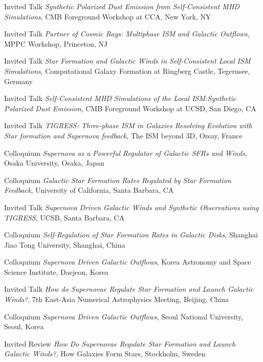 \documentclass[12pt]{article}
\begin{document}
{Invited Talk}
{\emph{Synthetic Polarized Dust Emission from Self-Consistent MHD Simulations},
CMB Foreground Workshop at CCA,
New York, NY}

{Invited Talk}
{\emph{Partner of Cosmic Rays: Multiphase ISM and Galactic Outflows},
MPPC Workshop,
Princeton, NJ}

{Invited Talk}
{\emph{Star Formation and Galactic Winds in Self-Consistent Local ISM Simulations},
Computational Galaxy Formation at Ringberg Castle,
Tegernsee, Germany}

{Invited Talk}
{\emph{Self-Consistent MHD Simulations of the Local ISM:Synthetic Polarized Dust Emission},
CMB Foreground Workshop at UCSD,
San Diego, CA}

{Invited Talk}
{\emph{TIGRESS: Three-phase ISM in Galaxies Resolving Evolution with Star formation and Supernova feedback},
The ISM beyond 3D,
Orsay, France}

{Colloquium}
{\emph{Supernova as a Powerful Regulator of Galactic SFRs and Winds},
Osaka University,
Osaka, Japan}

{Colloquium}
{\emph{Galactic Star Formation Rates Regulated by Star Formation Feedback},
University of California,
Santa Barbara, CA}

{Invited Talk}
{\emph{Supernova Driven Galactic Winds and Synthetic Observations using TIGRESS},
UCSB,
Santa Barbara, CA}

{Colloquium}
{\emph{Self-Regulation of Star Formation Rates in Galactic Disks},
Shanghai Jiao Tong University,
Shanghai, China}

{Colloquium}
{\emph{Supernova Driven Galactic Outflows},
Korea Astronomy and Space Science Institute,
Daejeon, Korea}

{Invited Talk}
{\emph{How do Supernovae Regulate Star Formation and Launch Galactic Winds?},
7th East-Asia Numerical Astrophysics Meeting,
Beijing, China}

{Colloquium}
{\emph{Supernova Driven Galactic Outflows},
Seoul National University,
Seoul, Korea}

{Invited Review}
{\emph{How Do Supernovae Regulate Star Formation and Launch Galactic Winds?},
How Galaxies Form Stars,
Stockholm, Sweden}
\end{document}
